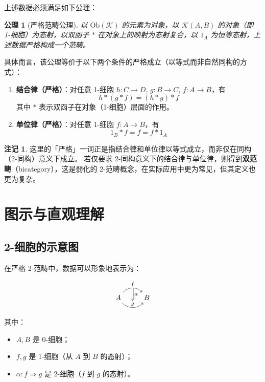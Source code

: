 \documentclass[UTF8,a4paper,12pt]{ctexart}
\theoremstyle{definition}
\newtheorem{remark}{注记}[section]
\theoremstyle{plain}
\newtheorem{axiom}{公理}[section]
\newcommand{\cat}[1]{\mathcal{#1}}
\newcommand{\Ob}{\mathrm{Ob}}
\begin{document}
上述数据必须满足如下公理：

\begin{axiom}[严格范畴公理]
以 $\Ob(\cat{K})$ 的元素为对象，以 $\cat{K}(A,B)$ 的对象（即 1-细胞）为态射，以双函子 $*$ 在对象上的映射为态射复合，以 $1_A$ 为恒等态射，上述数据严格构成一个范畴。
\end{axiom}

具体而言，该公理等价于以下两个条件的严格成立（以等式而非自然同构的方式）：

\begin{enumerate}
  \item \textbf{结合律（严格）}：对任意 1-细胞 $h : C \to D$, $g : B \to C$, $f : A \to B$，有
  \[
  h * (g * f) = (h * g) * f
  \]
  其中 $*$ 表示双函子在对象（1-细胞）层面的作用。
  
  \item \textbf{单位律（严格）}：对任意 1-细胞 $f : A \to B$，有
  \[
  1_B * f = f = f * 1_A
  \]
\end{enumerate}

\begin{remark}
  这里的「严格」一词正是指结合律和单位律以等式成立，而非仅在同构（2-同构）意义下成立。
  若仅要求 2-同构意义下的结合律与单位律，则得到\textbf{双范畴}（bicategory），这是弱化的 2-范畴概念，在实际应用中更为常见，但其定义也更为复杂。
\end{remark}

\section{图示与直观理解}

\subsection{2-细胞的示意图}

在严格 2-范畴中，数据可以形象地表示为：

\[
\begin{tikzcd}
  A \ar[r,bend left=50,"f"{name=U}] \ar[r,bend right=50,"g"{name=D}] &
  B
  \ar[Rightarrow,from=U,to=D,"\alpha"]
\end{tikzcd}
\]

其中：
\begin{itemize}
  \item $A, B$ 是 0-细胞；
  \item $f, g$ 是 1-细胞（从 $A$ 到 $B$ 的态射）；
  \item $\alpha : f \Rightarrow g$ 是 2-细胞（$f$ 到 $g$ 的态射）。
\end{itemize}
\end{document}
